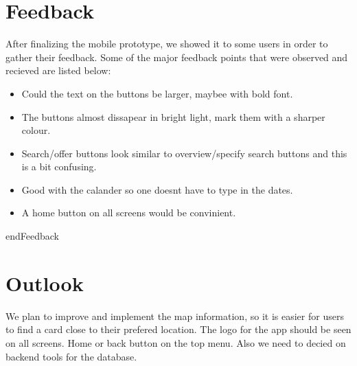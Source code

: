 \documentclass[11pt,twoside,a4paper]{report}
\begin{document}
\section{Feedback}
After finalizing the mobile prototype, we showed it to some users in order to gather their feedback. Some of the major feedback points that were observed and 
recieved are listed below:

\begin{itemize}
\item Could the text on the buttons be larger, maybee with bold font.
\item The buttons almost dissapear in bright light, mark them with a sharper colour.
\item Search/offer buttons look similar to overview/specify search buttons and this is a bit confusing.
\item Good with the calander so one doesnt have to type in the dates.
\item A home button on all screens would be convinient.

\end{itemize}

end{Feedback}


\section{Outlook}

We plan to improve and implement the map information, so it is easier for users to find a card close to their prefered location. The logo for the app should be seen on all screens.
Home or back button on the top menu. Also we need to decied on backend tools for the database.
\end{document}
